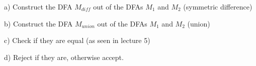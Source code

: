 
a) Construct the DFA $M_{diff}$ out of the DFAs $M_1$ and $M_2$ (symmetric difference)

b) Construct the DFA $M_{union}$ out of the DFAs $M_1$ and $M_2$ (union)

c) Check if they are equal (as seen in lecture 5)

d) Reject if they are, otherwise accept.